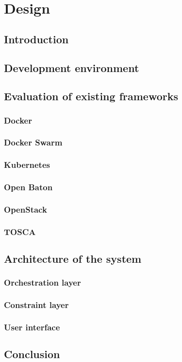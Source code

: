 \chapter{Design}

\section{Introduction}

\section{Development environment}

\section{Evaluation of existing frameworks}

\subsection{Docker}

\subsection{Docker Swarm}

\subsection{Kubernetes}

\subsection{Open Baton}

\subsection{OpenStack}

\subsection{TOSCA}

\section{Architecture of the system}

\subsection{Orchestration layer}

\subsection{Constraint layer}

\subsection{User interface}

\section{Conclusion}
